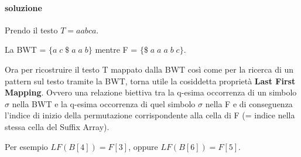 \paragraph{soluzione} Prendo il testo $T = aabca$.

La BWT = $\{a \; c \; \$ \; a \; a \; b\}$ mentre F = $\{\$ \; a \; a \; a \; b \; c\}$.

Ora per ricostruire il testo T mappato dalla BWT cos\`i come per la ricerca di un pattern sul testo tramite la BWT, torna utile la cosiddetta propriet\`a \textbf{Last First Mapping}.
Ovvero una relazione biettiva tra la q-esima occorrenza di un simbolo $\sigma$ nella BWT e la q-esima occorrenza di quel simbolo $\sigma$ nella F e di conseguenza l'indice di inizio della permutazione corrispondente alla cella di F (= indice nella stessa cella del Suffix Array).

Per esempio $LF(B[4]) = F[3]$, oppure $LF(B[6]) = F[5]$.
